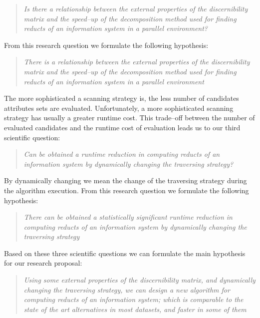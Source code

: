 \documentclass[authoryear,11pt]{elsarticle}
\begin{document}
\begin{quote}
  \emph{Is there a relationship between the external properties of the discernibility matrix and the 
  		speed--up of the decomposition method used for finding reducts of an information system 
  		in a parallel environment?}
\end{quote}

  From this research question we formulate the following hypothesis:
    
\begin{quote}
  \emph{There is a relationship between the external properties of the discernibility matrix and the 
  		speed--up of the decomposition method used for finding reducts of an information
  		system in a parallel environment}
\end{quote}
  
  The more sophisticated a scanning strategy is, the less number of candidates attributes sets are 
  evaluated. Unfortunately, a more sophisticated scanning strategy has usually a greater runtime cost.
  This trade--off between the number of evaluated candidates and the runtime cost of evaluation leads us 
  to our third scientific question:
  
\begin{quote}
  \emph{Can be obtained a runtime reduction in computing reducts of an information system by 
  		dynamically changing the traversing strategy?}
\end{quote}
  By dynamically changing we mean the change of the traversing strategy during the algorithm execution.
  From this research question we formulate the following hypothesis:
    
\begin{quote}
  \emph{There can be obtained a statistically significant runtime reduction in computing reducts of an 
  		information system by dynamically changing the traversing strategy}
\end{quote}

  Based on these three scientific questions we can formulate the main hypothesis for our research proposal:
  
\begin{quote}
  \emph{Using some external properties of the discernibility matrix, and dynamically changing the traversing 
  		strategy, we can design a new algorithm for computing reducts of an information system; which is
  		comparable to the state of the art alternatives in most datasets, and faster in some of them}
\end{quote}  
\end{document}
